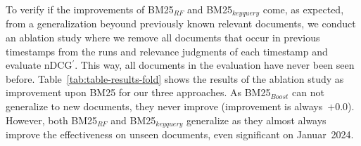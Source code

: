 

To verify if the improvements of BM25$_{RF}$ and BM25$_{keyquery}$ come, as expected, from a generalization beyound previously known relevant documents, we conduct an ablation study where we remove all documents that occur in previous timestamps from the runs and relevance judgments of each timestamp and evaluate nDCG$^{'}$. This way, all documents in the evaluation have never been seen before. Table~\ref{tab:table-results-fold} shows the results of the ablation study as improvement upon BM25 for our three approaches. As BM25$_{Boost}$ can not generalize to new documents, they never improve (improvement is always~$+0.0$). However, both BM25$_{RF}$ and BM25$_{keyquery}$ generalize as they almost always improve the effectiveness on unseen documents, even significant on Januar~2024.
